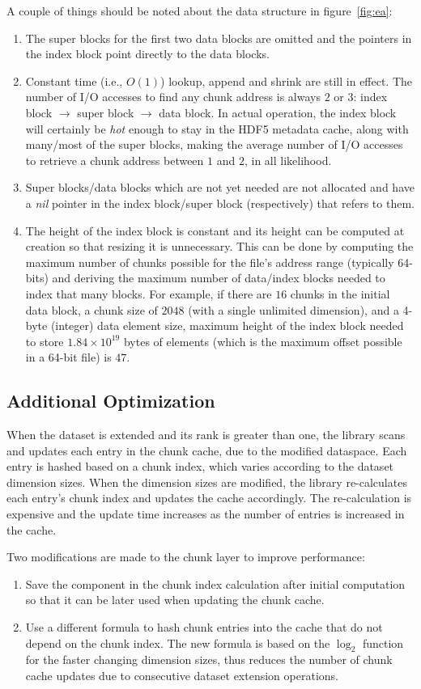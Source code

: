 A couple of things should be noted about the data structure in
figure~\ref{fig:ea}:
\begin{enumerate}
\item The super blocks for the first two data blocks are omitted and the pointers
in the index block point directly to the data blocks.
\item Constant time (i.e., $O(1)$) lookup, append and shrink are still in effect.
The number of I/O accesses to find any chunk address is always $2$ or $3$:
index block $\rightarrow$ super block $\rightarrow$ data block. In
actual operation, the index block will certainly be \textit{hot} enough to stay
in the HDF5 metadata cache, along with many/most of the super blocks,
making the average number of I/O accesses to retrieve a chunk address between
$1$ and $2$, in all likelihood.
\item Super blocks/data blocks which are not yet needed are not allocated and
have a \textit{nil} pointer in the index block/super block (respectively) that refers to them.
\item The height of the index block is constant and its height can be computed
at creation so that resizing it is unnecessary. This can be done by computing
the maximum number of chunks possible for the file's address range
(typically 64-bits) and deriving the maximum number of data/index blocks needed
to index that many blocks. For example, if there are $16$ chunks in the initial
data block, a chunk size of $2048$ (with a single unlimited dimension), and a
4-byte (integer) data element size, maximum height of the index block needed to
store $1.84\times 10^{19}$ bytes of elements (which is the maximum offset possible in a
64-bit file) is $47$.
\end{enumerate}

\subsection{Additional Optimization}
When the dataset is extended and its rank is greater than one, the library scans
and updates each entry in the chunk cache, due to the modified dataspace.
Each entry is hashed based on a chunk index, which varies according to the
dataset dimension sizes. When the dimension sizes are modified, the library
re-calculates each entry's chunk index and updates the cache accordingly.
The re-calculation is expensive and the update time increases as the number of
entries is increased in the cache.

Two modifications are made to the chunk layer to improve performance:
\begin{enumerate}
\item Save the component in the chunk index calculation after
initial computation so that it can be later used when updating the chunk cache.
\item Use a different formula to hash chunk entries into the cache that do not depend
on the chunk index. The new formula is based on the $\log_2$ function
for the faster changing dimension sizes, thus reduces the number of chunk cache
updates due to consecutive dataset extension operations.
\end{enumerate}

